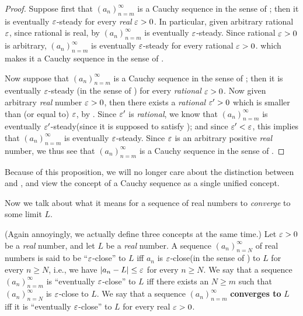 \begin{proof}
Suppose first that \((a_n)_{n = m}^{\infty}\) is a Cauchy sequence in the sense of ;
then it is eventually \(\varepsilon\)-steady for every \emph{real} \(\varepsilon > 0\).
In particular, given arbitrary rational \(\varepsilon\), since rational is real, by  \((a_n)_{n = m}^{\infty}\) is eventually \(\varepsilon\)-steady.
Since rational \(\varepsilon > 0\) is arbitrary, \((a_n)_{n = m}^{\infty}\) is eventually \(\varepsilon\)-steady for every rational \(\varepsilon > 0\).
which makes it a Cauchy sequence in the sense of .

Now suppose that \((a_n)_{n = m}^{\infty}\) is a Cauchy sequence in the sense of ;
then it is eventually \(\varepsilon\)-steady (in the sense of ) for every \emph{rational} \(\varepsilon > 0\).
Now given arbitrary \emph{real} number \(\varepsilon > 0\), then there exists a \emph{rational} \(\varepsilon' > 0\) which is smaller than (or equal to) \(\varepsilon\), by .
Since \(\varepsilon'\) is \emph{rational}, we know that \((a_n)_{n = m}^{\infty}\) is eventually \(\varepsilon'\)-steady(since it is supposed to satisfy );
and since \(\varepsilon' < \varepsilon\), this implies that \((a_n)_{n = m}^{\infty}\) is eventually \(\varepsilon\)-steady.
Since \(\varepsilon\) is an arbitrary positive \emph{real} number, we thus see that \((a_n)_{n = m}^{\infty}\) is a Cauchy sequence in the sense of .
\end{proof}

\begin{note}
Because of this proposition, we will no longer care about the distinction between  and , and view the concept of a Cauchy sequence as a single unified concept.
\end{note}

Now we talk about what it means for a sequence of real numbers to \emph{converge} to some limit \(L\).

\begin{definition}  \label{def 6.1.5}
(Again annoyingly, we actually define three concepts at the same time.)
Let \(\varepsilon > 0\) be a \emph{real} number, and let \(L\) be a \emph{real} number.
A sequence \((a_n)_{n = N}^{\infty}\) of real numbers is said to be ``\(\varepsilon\)-close'' to \(L\) iff \(a_n\) is \(\varepsilon\)-close(in the sense of ) to \(L\) for every \(n \ge N\),
i.e., we have \(\lvert a_n - L\rvert \le \varepsilon\) for every \(n \ge N\).
We say that a sequence \((a_n)_{n = m}^{\infty}\) is ``eventually \(\varepsilon\)-close'' to \(L\) iff there exists an \(N \ge m\) such that \((a_n)_{n = N}^{\infty}\) is \(\varepsilon\)-close to \(L\).
We say that a sequence \((a_n)_{n = m}^{\infty}\) \textbf{converges to} \(L\) iff it is ``eventually \(\varepsilon\)-close'' to \(L\) for every real \(\varepsilon > 0\).
\end{definition}

